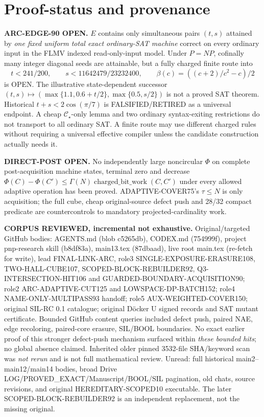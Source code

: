 \documentclass[11pt]{article}
\newcommand{\CS}{\mathcal C_\star}
\begin{document}
\section{Proof-status and provenance}
\textbf{ARC-EDGE-90 OPEN.} $E$ contains only simultaneous pairs $(t,s)$ attained by \emph{one fixed uniform total exact ordinary-SAT machine} correct on every ordinary input in the FLMV indexed read-only-input model. Under $P=NP$, cofinally many integer diagonal seeds are attainable, but a fully charged finite route into
\[
t<241/200,\qquad s<11642479/23232400,\qquad
\beta(c)=((c+2)/c^2-c)/2
\]
is OPEN. The illustrative state-dependent successor $(t,s)\mapsto(\max\{1.1,0.6+t/2\},\max\{0.5,s/2\})$ is not a proved SAT theorem. Historical $t+s<2\cos(\pi/7)$ is FALSIFIED/RETIRED as a universal endpoint. A cheap $\CS$-only lemma and two ordinary syntax-exiting restrictions do not transport to all ordinary SAT. A finite route may use different charged rules without requiring a universal effective compiler unless the candidate construction actually needs it.

\textbf{DIRECT-POST OPEN.} No independently large noncircular $\Phi$ on complete post-acquisition machine states, terminal zero and decrease $\Phi(C)-\Phi(C')\le\Gamma(N)\operatorname{charged\_bit\_work}(C,C')$ under every allowed adaptive operation has been proved. ADAPTIVE-COVER75's $\tau\le N$ is only acquisition; the full cube, cheap original-source defect push and 28/32 compact predicate are countercontrols to mandatory projected-cardinality work.

\textbf{CORPUS REVIEWED, incremental not exhaustive.} Original/targeted GitHub bodies: AGENTS.md (blob c5265db), CODEX.md (754999f), project pnp-research skill (b8df83a), main13.tex (87dbaad), live root main.tex (re-fetch for write), lead FINAL-LINK-ARC, role3 SINGLE-EXPOSURE-ERASURE108, TWO-HALL-CUBE107, SCOPED-BLOCK-REBUILDER92, Q3-INTERSECTION-HIT106 and GUARDED-BOUNDARY-ACQUISITION90; role2 ARC-ADAPTIVE-CUT125 and LOWSPACE-DP-BATCH152; role4 NAME-ONLY-MULTIPASS93 handoff; role5 AUX-WEIGHTED-COVER150; original SIL-RC 0.1 catalogue; original D\"ocker U signed records and SAT mutant certificate. Bounded GitHub content queries included defect push, paired NAE, edge recoloring, paired-core erasure, SIL/BOOL boundaries. No exact earlier proof of this stronger defect-push mechanism surfaced within \emph{these bounded hits}; no global absence claimed. Inherited older pinned 3532-file SHA/keyword scan was \emph{not rerun} and is not full mathematical review. Unread: full historical main2--main12/main14 bodies, broad Drive LOG/PROVED\_EXACT/Manuscript/BOOL/SIL pagination, old chats, source revisions, and original HEREDITARY-SCOPED10 executable. The later SCOPED-BLOCK-REBUILDER92 is an independent replacement, not the missing original.
\end{document}
